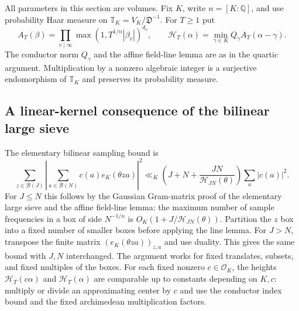 \documentclass[11pt,reqno]{amsart}
\numberwithin{equation}{section}
\theoremstyle{definition}
\begin{document}
All parameters in this section are volumes.  Fix $K$, write $n=[K:\mathbb Q]$,
and use probability Haar measure on $\mathbb T_K=V_K/\mathfrak D^{-1}$.
For $T\ge1$ put
\[
 A_T(\beta)=\prod_{v\mid\infty}\max(1,T^{1/n}|\beta_v|)^{d_v},\qquad
 \mathcal H_T(\alpha)=\min_{\gamma\in K}Q_\gamma A_T(\alpha-\gamma).
\]
The conductor norm $Q_\gamma$ and the affine field-line lemma are as in the
quartic argument.  Multiplication by a nonzero algebraic integer is a
surjective endomorphism of $\mathbb T_K$ and preserves its probability measure.

\subsection{A linear-kernel consequence of the bilinear large sieve}

The elementary bilinear sampling bound is
\begin{equation}\label{eq:g7-bilinear}
 \sum_{z\in\mathcal B(J)}\left|\sum_{a\in\mathcal B(N)}c(a)e_K(\theta za)\right|^2
 \ll_K\left(J+N+\frac{JN}{\mathcal H_{JN}(\theta)}\right)\sum_a|c(a)|^2.
\end{equation}
For $J\le N$ this follows by the Gaussian Gram-matrix proof of the elementary
large sieve and the affine field-line lemma: the maximum number of sample
frequencies in a box of side $N^{-1/n}$ is
$O_K(1+J/\mathcal H_{JN}(\theta))$.  Partition the $z$ box into a fixed number
of smaller boxes before applying the line lemma.  For $J>N$, transpose the
finite matrix $(e_K(\theta za))_{z,a}$ and use duality.  This gives the same
bound with $J,N$ interchanged.  The argument works for fixed translates,
subsets, and fixed multiples of the boxes.  For each fixed nonzero
$c\in\mathcal O_K$, the heights $\mathcal H_T(c\alpha)$ and
$\mathcal H_T(\alpha)$ are comparable up to constants depending on $K,c$:
multiply or divide an approximating center by $c$ and use the conductor
index bound and the fixed archimedean multiplication factors.
\end{document}

